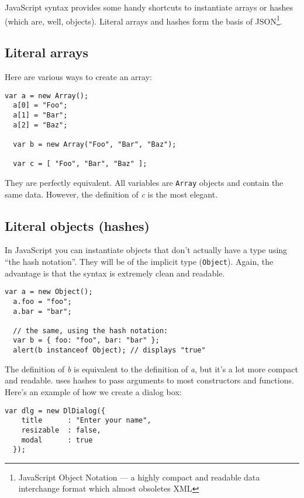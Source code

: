 JavaScript syntax provides some handy shortcuts to instantiate arrays or
hashes (which are, well, objects).  Literal arrays and hashes form the basis
of JSON\footnote{JavaScript Object Notation — a highly compact and readable
  data interchange format which almost obsoletes XML}.

\subsection*{Literal arrays}

Here are various ways to create an array:

\begin{lstlisting}[nolol]
  var a = new Array();
  a[0] = "Foo";
  a[1] = "Bar";
  a[2] = "Baz";

  var b = new Array("Foo", "Bar", "Baz");

  var c = [ "Foo", "Bar", "Baz" ];
\end{lstlisting}

They are perfectly equivalent.  All variables are \lstinline{Array} objects
and contain the same data.  However, the definition of \textit{c} is the most
elegant.

\subsection*{Literal objects (hashes)}

In JavaScript you can instantiate objects that don't actually have a type
using “the hash notation”.  They will be of the implicit type
(\lstinline{Object}).  Again, the advantage is that the syntax is extremely
clean and readable.

\begin{lstlisting}[nolol]
  var a = new Object();
  a.foo = "foo";
  a.bar = "bar";

  // the same, using the hash notation:
  var b = { foo: "foo", bar: "bar" };
  alert(b instanceof Object); // displays "true"
\end{lstlisting}

The definition of \textit{b} is equivalent to the definition of \textit{a},
but it's a lot more compact and readable.  \TheLibName{} uses hashes to pass
arguments to most constructors and functions.  Here's an example of how we
create a dialog box:

\begin{lstlisting}[nolol,style=DL]
  var dlg = new DlDialog({
    title      : "Enter your name",
    resizable  : false,
    modal      : true
  });
\end{lstlisting}



